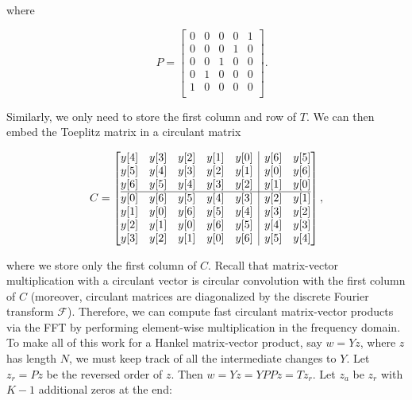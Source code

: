 \documentclass[journal]{IEEEtran}
\begin{document}
\noindent where

\[               \quad P = \begin{bmatrix} 0 & 0 & 0 & 0 & 1\\
                                        0 & 0 & 0 & 1 & 0\\
                                        0 & 0 & 1 & 0 & 0\\
                                        0 & 1 & 0 & 0 & 0\\
                                        1 & 0 & 0 & 0 & 0\\ \end{bmatrix}. \] 

\noindent Similarly, we only need to store the first column and row of $T$.  We can then embed the Toeplitz matrix in a circulant matrix

   \[ C = \left[\begin{array}{@{}ccccc|cc@{}}
                y[4] & y[3] & y[2] & y[1] & y[0] & y[6] & y[5]\\
                y[5] & y[4] & y[3] & y[2] & y[1] & y[0] & y[6]\\
                y[6] & y[5] & y[4] & y[3] & y[2] & y[1] & y[0]\\
                \hline
                y[0] & y[6] & y[5] & y[4] & y[3] & y[2] & y[1]\\
                y[1] & y[0] & y[6] & y[5] & y[4] & y[3] & y[2]\\
                y[2] & y[1] & y[0] & y[6] & y[5] & y[4] & y[3]\\
                y[3] & y[2] & y[1] & y[0] & y[6] & y[5] & y[4]\\
                \end{array}\right], \] 

\noindent where we store only the first column of $C$.  Recall that matrix-vector multiplication with a circulant vector is circular convolution with the first column of $C$ (moreover, circulant matrices are diagonalized by the discrete Fourier transform $\mathcal{F}$).  Therefore, we can compute fast circulant matrix-vector products via the FFT by performing element-wise multiplication in the frequency domain.\\

To make all of this work for a Hankel matrix-vector product, say $w=Yz$, where $z$ has length $N$, we must keep track of all the intermediate changes to $Y$.  Let $z_r = Pz$ be the reversed order of $z$.  Then ${w=Yz=YPPz=Tz_r}$.  Let $z_a$ be $z_r$ with $K-1$ additional zeros at the end:
\end{document}
